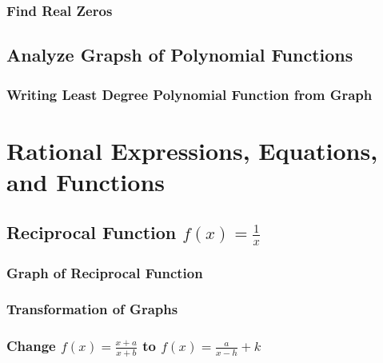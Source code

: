 \documentclass[]{book}
\begin{document}
\hypertarget{find-real-zeros}{%
\subsection{Find Real Zeros}\label{find-real-zeros}}

\hypertarget{analyze-grapsh-of-polynomial-functions}{%
\section{Analyze Grapsh of Polynomial Functions}\label{analyze-grapsh-of-polynomial-functions}}

\hypertarget{writing-least-degree-polynomial-function-from-graph}{%
\subsection{Writing Least Degree Polynomial Function from Graph}\label{writing-least-degree-polynomial-function-from-graph}}

\hypertarget{Rational}{%
\chapter{Rational Expressions, Equations, and Functions}\label{Rational}}

\hypertarget{reciprocal-function-fxfrac1x}{%
\section{\texorpdfstring{Reciprocal Function \(f(x)=\frac{1}{x}\)}{Reciprocal Function f(x)=\textbackslash{}frac\{1\}\{x\}}}\label{reciprocal-function-fxfrac1x}}

\hypertarget{graph-of-reciprocal-function}{%
\subsection{Graph of Reciprocal Function}\label{graph-of-reciprocal-function}}

\hypertarget{transformation-of-graphs}{%
\subsection{Transformation of Graphs}\label{transformation-of-graphs}}

\hypertarget{change-fxfracxaxb-to-fxfracax-hk}{%
\subsection{\texorpdfstring{Change \(f(x)=\frac{x+a}{x+b}\) to \(f(x)=\frac{a}{x-h}+k\)}{Change f(x)=\textbackslash{}frac\{x+a\}\{x+b\} to f(x)=\textbackslash{}frac\{a\}\{x-h\}+k}}\label{change-fxfracxaxb-to-fxfracax-hk}}
\end{document}
